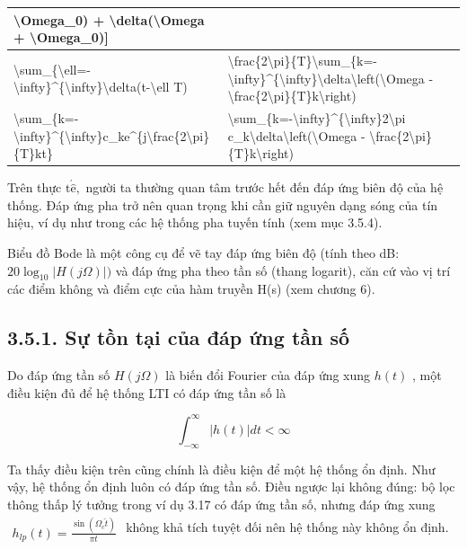 \documentclass[
  10
]{article}
\begin{document}
{\begin{longtable}[]{@{}|l|l|l|@{}}
\textbackslash Omega\_0) + \textbackslash delta(\textbackslash Omega +
\textbackslash Omega\_0){]} & \\
\hline
\textbackslash sum\_\{\textbackslash ell=-\textbackslash infty\}\^{}\{\textbackslash infty\}\textbackslash delta(t-\textbackslash ell
T) &
\textbackslash frac\{2\textbackslash pi\}\{T\}\textbackslash sum\_\{k=-\textbackslash infty\}\^{}\{\textbackslash infty\}\textbackslash delta\textbackslash left(\textbackslash Omega
- \textbackslash frac\{2\textbackslash pi\}\{T\}k\textbackslash right)
& \\
\hline
\textbackslash sum\_\{k=-\textbackslash infty\}\^{}\{\textbackslash infty\}c\_ke\^{}\{j\textbackslash frac\{2\textbackslash pi\}\{T\}kt\}
&
\textbackslash sum\_\{k=-\textbackslash infty\}\^{}\{\textbackslash infty\}2\textbackslash pi
c\_k\textbackslash delta\textbackslash left(\textbackslash Omega -
\textbackslash frac\{2\textbackslash pi\}\{T\}k\textbackslash right)
& \\
\hline
\end{longtable}
}

Trên thực \(\mathrm { t } \acute { \hat { \mathrm { e } } } ,\) người ta
thường quan tâm trước hết đến đáp ứng biên độ của hệ thống. Đáp ứng pha
trở nên quan trọng khi cần giữ nguyên dạng sóng của tín hiệu, ví dụ như
trong các hệ thống pha tuyến tính (xem mục 3.5.4).

Biểu đồ Bode là một công cụ để vẽ tay đáp ứng biên độ (tính theo dB:
\(2 0 \log _ { 1 0 } \left| H ( j \Omega ) \right| )\) và đáp ứng pha
theo tần số (thang logarit), căn cứ vào vị trí các điểm không và điểm
cực của hàm truyền H(s) (xem chương 6).

\subsection{3.5.1. Sự tồn tại của đáp ứng tần
số}\label{sux1ef1-tux1ed3n-tux1ea1i-cux1ee7a-ux111uxe1p-ux1ee9ng-tux1ea7n-sux1ed1}

Do đáp ứng tần số \(H ( j \Omega )\) là biến đổi Fourier của đáp ứng
xung \(h ( t )\) , một điều kiện đủ để hệ thống LTI có đáp ứng tần số là

\[
\int_ {- \infty} ^ {\infty} | h (t) | d t <   \infty
\]

Ta thấy điều kiện trên cũng chính là điều kiện để một hệ thống ổn định.
Như vậy, hệ thống ổn định luôn có đáp ứng tần số. Điều ngược lại không
đúng: bộ lọc thông thấp lý tưởng trong ví dụ 3.17 có đáp ứng tần số,
nhưng đáp ứng xung
\(\begin{array} { r } { h _ { l p } ( t ) = \frac { \sin ( \Omega _ { c } \hat { t } ) } { \pi t } } \end{array}\)
không khả tích tuyệt đối nên hệ thống này không ổn định.
\end{document}

